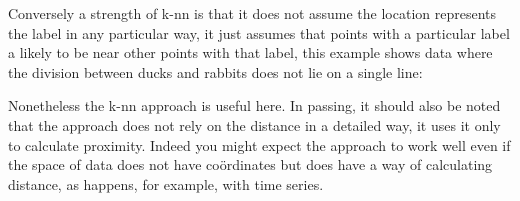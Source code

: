 \documentclass[12pt]{article}
\begin{document}
Conversely a strength of k-nn is that it does not assume the location
represents the label in any particular way, it just assumes that
points with a particular label a likely to be near other points with
that label, this example shows data where the division between ducks
and rabbits does not lie on a single line:
\begin{center}
\end{center}
Nonetheless the k-nn approach is useful here. In passing, it should
also be noted that the approach does not rely on the distance in a
detailed way, it uses it only to calculate proximity. Indeed you might
expect the approach to work well even if the space of data does not
have co\"{o}rdinates but does have a way of calculating distance, as
happens, for example, with time series.
\end{document}
